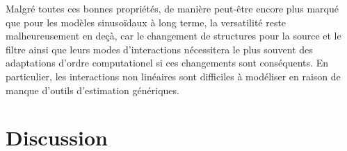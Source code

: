 
Malgré toutes ces bonnes propriétés, de manière peut-être encore plus marqué que pour les modèles sinusoïdaux à long terme, la versatilité reste malheureusement en deçà, car le changement de structures pour la source et le filtre ainsi que leurs modes d'interactions nécessitera le plus souvent des adaptations d'ordre computationel si ces changements sont conséquents. En particulier, les interactions non linéaires sont difficiles à modéliser en raison de manque d'outils d'estimation génériques.


\section{ \nmu Discussion}

